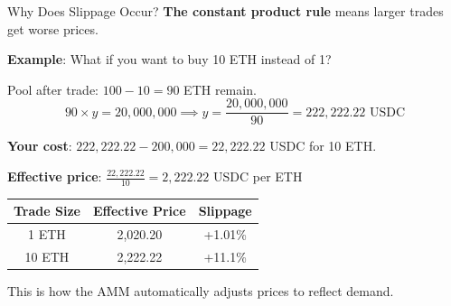 \documentclass[10pt]{beamer}
\begin{document}
\begin{frame}{Why Does Slippage Occur?}
  \textbf{The constant product rule} means larger trades get worse prices.
  
  \vspace{0.5em}
  \textbf{Example}: What if you want to buy 10 ETH instead of 1?
  
  \vspace{0.5em}
  Pool after trade: $100 - 10 = 90$ ETH remain.
  \[
  90 \times y = 20{,}000{,}000 \implies y = \frac{20{,}000{,}000}{90} = 222{,}222.22 \text{ USDC}
  \]
  
  \vspace{0.5em}
  \textbf{Your cost}: $222{,}222.22 - 200{,}000 = 22{,}222.22$ USDC for 10 ETH.
  
  \vspace{0.5em}
  \textbf{Effective price}: $\frac{22{,}222.22}{10} = 2{,}222.22$ USDC per ETH
  
  \vspace{1em}
  \begin{center}
  \begin{tabular}{ccc}
    \toprule
    \textbf{Trade Size} & \textbf{Effective Price} & \textbf{Slippage} \\
    \midrule
    1 ETH & 2,020.20 & +1.01\% \\
    10 ETH & 2,222.22 & +11.1\% \\
    \bottomrule
  \end{tabular}
  \end{center}
  
  \vspace{0.5em}
  This is how the AMM automatically adjusts prices to reflect demand.
\end{frame}
\end{document}
